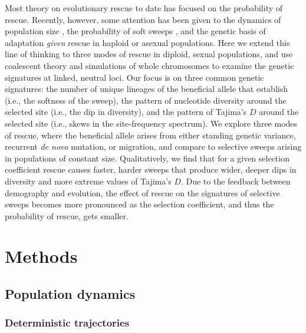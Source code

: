 \documentclass[]{article}
\begin{document}
Most theory on evolutionary rescue to date \citep[reviewed in][]{alexander2014evolutionary} has focused on the probability of rescue.
Recently, however, some attention has been given to the dynamics of population size \citep{orr2014population}, the probability of soft sweeps \citep{wilson2017soft}, and the genetic basis of adaptation \citep{osmond2020genetic} \textit{given} rescue in haploid or asexual populations.
Here we extend this line of thinking to three modes of rescue in diploid, sexual populations, and use coalescent theory and simulations of whole chromosomes to examine the genetic signatures at linked, neutral loci.
Our focus is on three common genetic signatures: the number of unique lineages of the beneficial allele that establish (i.e., the softness of the sweep), the pattern of nucleotide diversity around the selected site (i.e., the dip in diversity), and the pattern of Tajima's $D$ around the selected site (i.e., skews in the site-frequency spectrum).
We explore three modes of rescue, where the beneficial allele arises from either standing genetic variance, recurrent \textit{de novo} mutation, or migration, and compare to selective sweeps arising in populations of constant size.
Qualitatively, we find that for a given selection coefficient rescue causes faster, harder sweeps that produce wider, deeper dips in diversity and more extreme values of Tajima's $D$.
Due to the feedback between demography and evolution, the effect of rescue on the signatures of selective sweeps becomes more pronounced as the selection coefficient, and thus the probability of rescue, gets smaller.

\section*{Methods}
\label{sec:methods}

\subsection*{Population dynamics}

\subsubsection*{Deterministic trajectories}
\label{sec:rescue_forward}
\end{document}
